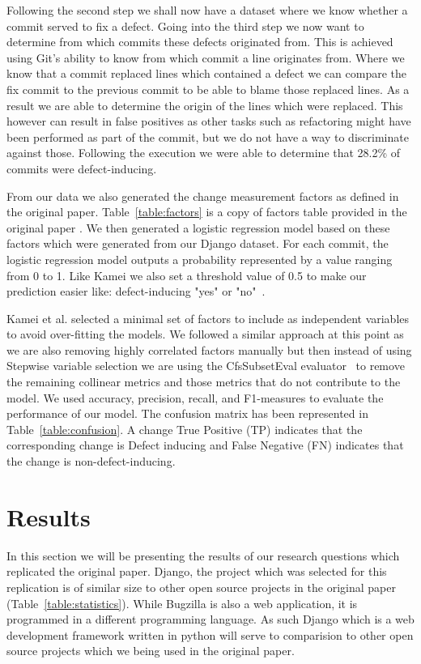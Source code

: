 \documentclass[10pt, conference]{IEEEtran}
\begin{document}
Following the second step we shall now have a dataset where we know whether a commit served to fix a defect. Going into the third step we now want to determine from which commits these defects originated from. This is achieved using Git's ability to know from which commit a line originates from. Where we know that a commit replaced lines which contained a defect we can compare the fix commit to the previous commit to be able to blame those replaced lines. As a result we are able to determine the origin of the lines which were replaced. This however can result in false positives as other tasks such as refactoring might have been performed as part of the commit, but we do not have a way to discriminate against those. Following the execution we were able to determine that 28.2\% of commits were defect-inducing. 

From our data we also generated the change measurement factors as defined in the original paper. Table~\ref{table:factors} is a copy of factors table provided in the original paper \cite{Kamei2013TSE}. We then generated a logistic regression model based on these factors which were generated from our Django dataset. For each commit, the logistic regression model outputs a probability represented by a value ranging from 0 to 1. Like Kamei we also set a threshold value of 0.5 to make our prediction easier like: defect-inducing "yes" or "no"~\cite{Gyimothy2005TSE,Guo2010ICSE}.

Kamei et al. selected a minimal set of factors to include as independent variables to avoid over-fitting the models. We followed a similar approach at this point as we are also removing highly correlated factors manually but then instead of using Stepwise variable selection we are using the CfsSubsetEval evaluator~\cite{Hall1998} to remove the remaining collinear metrics and those metrics that do not contribute to the model. We used accuracy, precision, recall, and F1-measures to evaluate the performance of our model. The confusion matrix has been represented in Table~\ref{table:confusion}. A change True Positive (TP) indicates that the corresponding change is Defect inducing and False Negative (FN) indicates that the change is non-defect-inducing.



\section{Results}
\label{sec:results}

In this section we will be presenting the results of our research questions which replicated the original paper. Django, the project which was selected for this replication is of similar size to other open source projects in the original paper (Table~\ref{table:statistics}). While Bugzilla is also a web application, it is programmed in a different programming language. As such Django which is a web development framework written in python will serve to comparision to other open source projects which we being used in the original paper.
\end{document}
